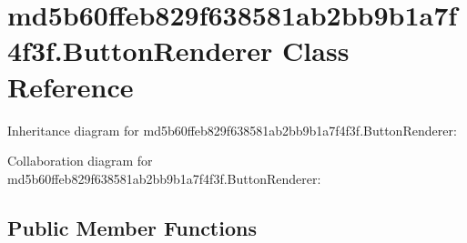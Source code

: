 \hypertarget{classmd5b60ffeb829f638581ab2bb9b1a7f4f3f_1_1_button_renderer}{}\section{md5b60ffeb829f638581ab2bb9b1a7f4f3f.\+Button\+Renderer Class Reference}
\label{classmd5b60ffeb829f638581ab2bb9b1a7f4f3f_1_1_button_renderer}


Inheritance diagram for md5b60ffeb829f638581ab2bb9b1a7f4f3f.\+Button\+Renderer\+:


Collaboration diagram for md5b60ffeb829f638581ab2bb9b1a7f4f3f.\+Button\+Renderer\+:
\subsection*{Public Member Functions}

